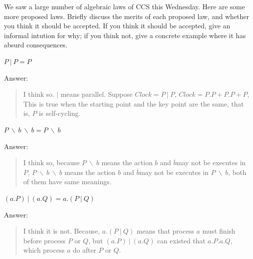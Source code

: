 \documentclass{article}
\begin{document}
\setcounter{question}{0}

\begin{Question} 
    We saw a large number of algebraic laws of CCS this Wednesday. Here are some more proposed laws. Briefly discuss the merits of each proposed law, and whether you think it should be accepted. If you think it should be accepted, give an informal intution for why; if you think not, give a concrete example where it has absurd consequences.

\begin{Subquestion}
    $P\ |\ P = P$
    
\begin{answer}
    Answer:
    \begin{quote}
        I think so. $|$ means parallel. Suppose $Clock = P\ |\ P$, $Clock = P.P + P.P + P$, This is true when the starting point and the key point are the same, that is, $P$ is self-cycling.\\
    \end{quote}
\end{answer}
\end{Subquestion}


\begin{Subquestion}
    $P\ \backslash\  b\ \backslash\ b = P\ \backslash\ b$
    
\begin{answer}
    Answer:
    \begin{quote}
        I think so, because $ P\ \backslash\  b$ means the action $b$ and  $\overline{b} $may not be executes in $P$,  $ P\ \backslash\  b\ \backslash\ b$ means the action $b$ and  $\overline{b} $may not be executes in $P\ \backslash\  b$, both of them have same meanings.\\
    \end{quote}
\end{answer}
\end{Subquestion}


\begin{Subquestion}
    $(a.P)\ |\ (a.Q)=a.(P\ |\ Q)$
    
\begin{answer}
    Answer:
    \begin{quote}
        I think it is not. Because, $a.(P\ |\ Q)$ means that process $a$ must finish before process $P$ or $Q$, but $(a.P)\ |\ (a.Q)$ can existed that $a.P.a.Q$, which process $a$ do after $P$ or $Q$.\\
    \end{quote}
\end{answer}
\end{Subquestion}
\end{Question}
\end{document}
